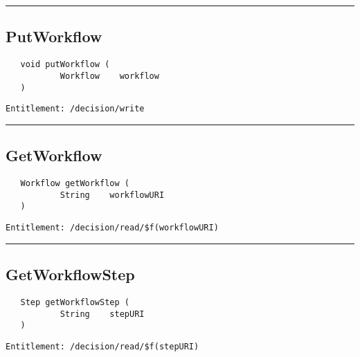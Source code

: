 \rule{12cm}{2pt}
\subsection{PutWorkflow}
\label{Api:PutWorkflow}
\begin{verbatim}
   void putWorkflow (
           Workflow    workflow
   )
\end{verbatim}
\begin{Verbatim}[fontsize=\small, formatcom=\color{Maroon}]
  Entitlement: /decision/write
\end{Verbatim}



\rule{12cm}{2pt}
\subsection{GetWorkflow}
\label{Api:GetWorkflow}
\begin{verbatim}
   Workflow getWorkflow (
           String    workflowURI
   )
\end{verbatim}
\begin{Verbatim}[fontsize=\small, formatcom=\color{Maroon}]
  Entitlement: /decision/read/$f(workflowURI)
\end{Verbatim}



\rule{12cm}{2pt}
\subsection{GetWorkflowStep}
\label{Api:GetWorkflowStep}
\begin{verbatim}
   Step getWorkflowStep (
           String    stepURI
   )
\end{verbatim}
\begin{Verbatim}[fontsize=\small, formatcom=\color{Maroon}]
  Entitlement: /decision/read/$f(stepURI)
\end{Verbatim}




